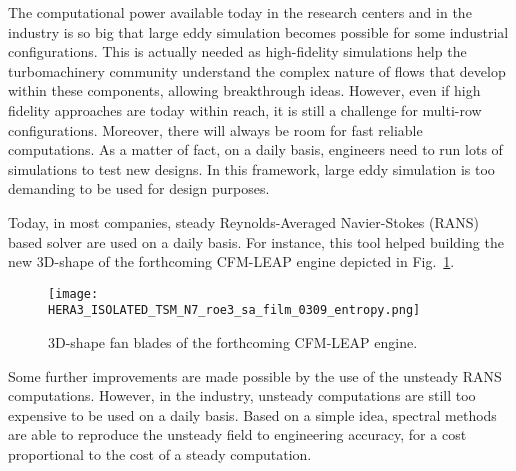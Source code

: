 
The computational power available today in
the research centers and in the industry
is so big that large eddy simulation
becomes possible for some industrial configurations.
This is actually needed as high-fidelity
simulations help the turbomachinery community understand
the complex nature of flows that develop 
within these components,
allowing breakthrough ideas.
However, even if high fidelity approaches
are today within reach, it is still a challenge for
multi-row configurations.
Moreover, there will always be room for fast reliable
computations. 
As a matter of fact, on a daily basis, engineers need
to run lots of simulations to test new designs.
In this framework, large eddy simulation is
too demanding to be used for design purposes.

Today, in most companies, steady Reynolds-Averaged
Navier-Stokes (RANS) based solver are used on a daily basis.
For instance, this tool 
helped building the new $3$D-shape
of the forthcoming CFM-LEAP engine
depicted in Fig.~\ref{fig:sm_leap}.
\begin{figure}[htbp]
  \centering
  \texttt{[image: HERA3\_ISOLATED\_TSM\_N7\_roe3\_sa\_film\_0309\_entropy.png]}
  \caption{$3$D-shape fan blades of the forthcoming CFM-LEAP engine.}
  \label{fig:sm_leap}
\end{figure}
Some further improvements are made possible by the use
of the unsteady RANS computations.
However, in the industry, unsteady computations
are still too expensive to be used on a daily basis.
Based on a simple idea, spectral methods are 
able to reproduce the unsteady field to engineering
accuracy, for a cost proportional to the cost of a
steady computation.

